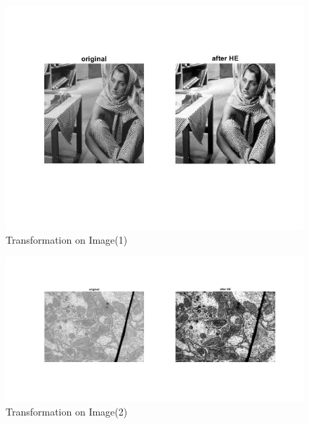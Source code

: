 \documentclass[12pt, a4paper]{article}
\begin{document}
\renewcommand{\thefigure}{3.1}
\begin{figure}[H]
    \centering
    \includegraphics[width=\textwidth]{c1.jpg}
    \vspace*{-110pt}
    \caption{Transformation on Image(1)}
    \label{fig:3.1}
\end{figure}
\renewcommand{\thefigure}{3.2}
\begin{figure}[H]
    \centering
    \vspace*{-30pt}
    \vspace*{-2.5pt}
    \includegraphics[width=\textwidth]{c2.jpg}
    \vspace*{-70pt}
    \caption{Transformation on Image(2)}
    \label{fig:3.2}
\end{figure}
\newpage
\renewcommand{\thefigure}{3.3}
\end{document}
